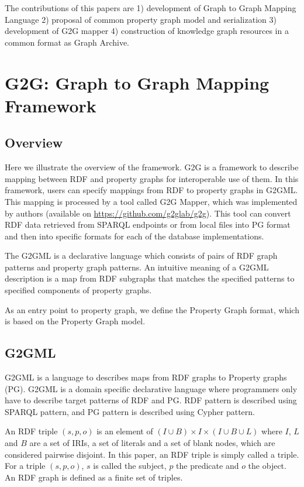 \documentclass[runningheads]{llncs}
\begin{document}
The contributions of this papers are 1) development of Graph to Graph Mapping Language 2) proposal of common property graph model and serialization 3) development of G2G mapper 4) construction of knowledge graph resources in a common format as Graph Archive.


\section{G2G: Graph to Graph Mapping Framework}

\subsection{Overview}

Here we illustrate the overview of the framework.
G2G is a framework to describe mapping between RDF and property graphs for interoperable use of them. In this framework, users can specify mappings from RDF to property graphs in G2GML.
This mapping is processed by a tool called G2G Mapper, which was implemented by authors (available on \url{https://github.com/g2glab/g2g}). This tool can convert RDF data retrieved from SPARQL endpoints or from local files into PG format and then into specific formats for each of the database implementations.

The G2GML is a declarative language which consists of pairs of RDF graph patterns and property graph patterns. 
An intuitive meaning of a G2GML description is a map from  RDF subgraphs that matches the specified patterns to specified components of property graphs.

As an entry point to property graph, we define the Property Graph format, which is based on the Property Graph model.



\subsection{G2GML}

G2GML is a language to describes maps from RDF graphs to Property graphs (PG). G2GML is a domain specific declarative language where programmers only have to describe target patterns of RDF and PG. RDF pattern is described using SPARQL pattern, and PG pattern is described using Cypher pattern.

\begin{prel}
An RDF triple $(s, p, o)$ is an element of $(I \cup B) \times I \times (I \cup B \cup L)$ where $I$, $L$ and $B$ are a set of IRIs, a set of literals and a set of blank nodes, which are considered pairwise disjoint. In this paper, an RDF triple is simply called a triple. For a triple $(s, p, o)$, $s$ is called the subject, $p$ the predicate and $o$ the object. An RDF graph is defined as a finite set of triples.
\end{prel}
\end{document}
